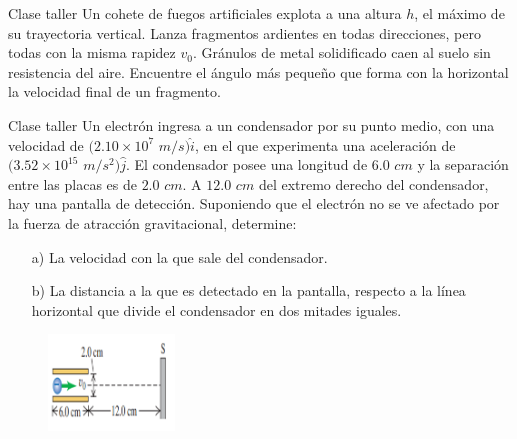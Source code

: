 \begin{frame}{Clase taller}
    Un cohete de fuegos artificiales explota a una altura $h$, el máximo de su trayectoria vertical. Lanza fragmentos ardientes en
todas direcciones, pero todas con la misma rapidez $v_0$. Gránulos
de metal solidificado caen al suelo sin resistencia del aire. Encuentre el ángulo más pequeño que forma con la horizontal
la velocidad final de un fragmento.
\end{frame}

\begin{frame}{Clase taller}
    Un electrón ingresa a un condensador por su punto medio, con una velocidad de $(2.10\times10^{7}$ $m/s)\hat{i}$, en el que experimenta una aceleración de $(3.52\times10^{15}$ $m/s^2)\hat{j}$. El condensador posee una longitud de $6.0$ $cm$ y la separación entre las placas es de $2.0$ $cm$. A $12.0$ $cm$ del extremo derecho del condensador, hay una pantalla de detección. Suponiendo que el electrón no se ve afectado por la fuerza de atracción gravitacional, determine:
	    
	    \begin{itemize}
	        \item[a)] La velocidad con la que sale del condensador.
	        \item[b)] La distancia a la que es detectado en la pantalla, respecto a la línea horizontal que divide el condensador en dos mitades iguales.
	    \end{itemize}
        \begin{figure}[H]
  \centering
    \includegraphics[width=0.3\textwidth]{figures/E.png}
\end{figure}
\end{frame}